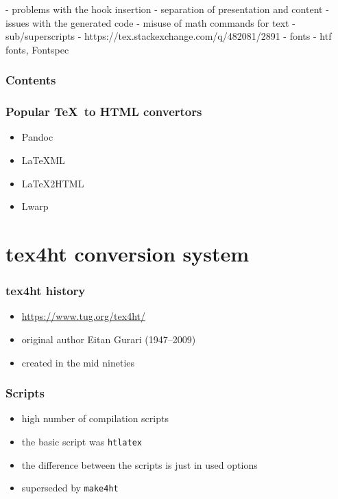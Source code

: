 - problems with the hook insertion
  - separation of presentation and content
- issues with the generated code
  - misuse of math commands for text 
- sub/superscripts - https://tex.stackexchange.com/q/482081/2891
- fonts - htf fonts, Fontspec


\begin{frame}
  \frametitle{Contents}
  \tableofcontents
\end{frame}



\begin{frame}
  \frametitle{Popular \TeX\ to HTML convertors}
  \begin{itemize}
    \item Pandoc
    \item LaTeXML
    \item LaTeX2HTML
    \item Lwarp
  \end{itemize}
\end{frame}

\section{tex4ht conversion system}


\begin{frame}
  \frametitle{tex4ht history}
  \begin{itemize}
    \item \url{https://www.tug.org/tex4ht/}
    \item original author Eitan Gurari (1947--2009)
    \item created in the mid nineties
  \end{itemize}
\end{frame}


\begin{frame}

  \frametitle{Scripts}
  \begin{itemize}
    \item high number of compilation scripts
    \item the basic script was \texttt{htlatex} 
    \item the difference between the scripts is just in used options
    \item superseded by \texttt{make4ht}
\end{itemize}
\end{frame}



